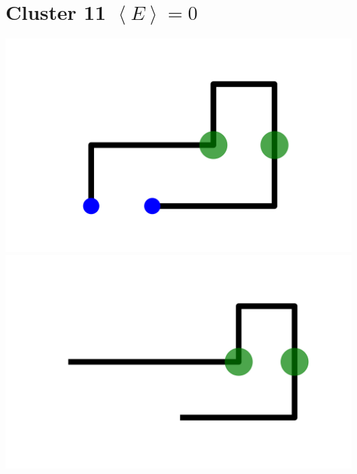 \documentclass[]{report}
\begin{document}
\section{Cluster 11 $\left < E \right > = 0$} 
\includegraphics[scale=.1]{pictures/11/state_cluster_shapes_0.pdf} 
\includegraphics[scale=.1]{pictures/11/state_cluster_shapes_1.pdf} 
\end{document}

